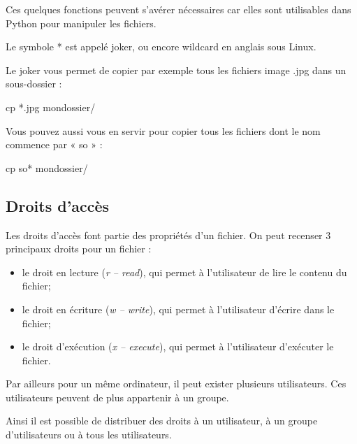 \documentclass[11pt,oneside]{article}
\begin{document}
Ces quelques fonctions peuvent s'avérer nécessaires car elles sont utilisables dans Python pour manipuler les fichiers. 


Le symbole * est appelé joker, ou encore wildcard en anglais sous Linux. 

\begin{minipage}[c]{.46\linewidth}
\begin{term}

Le joker vous permet de copier par exemple tous les fichiers image .jpg dans un sous-dossier :
\begin{termi}[H]
cp *.jpg mondossier/
\end{termi}
\end{term}
\end{minipage}\hfill
\begin{minipage}[c]{.46\linewidth}
\begin{term}
Vous pouvez aussi vous en servir pour copier tous les fichiers dont le nom commence par « so » :
\begin{termi}[H]
cp so* mondossier/
\end{termi}
\end{term}
\end{minipage}

\subsection{Droits d’accès}

Les droits d'accès font partie des propriétés d'un fichier. On peut recenser 3 principaux droits pour un fichier : 
\begin{itemize}
\item le droit en lecture (\textit{r -- read}), qui permet à l'utilisateur de lire le contenu du fichier;
\item le droit en écriture (\textit{w -- write}), qui permet à l'utilisateur d'écrire dans le fichier;
\item le droit d'exécution (\textit{x -- execute}), qui permet à l'utilisateur d'exécuter le fichier.
\end{itemize}

Par ailleurs pour un même ordinateur, il peut exister plusieurs utilisateurs. Ces utilisateurs peuvent de plus appartenir à un groupe.

Ainsi il est possible de distribuer des droits à un utilisateur, à un groupe d'utilisateurs ou à tous les utilisateurs.  
\end{document}
